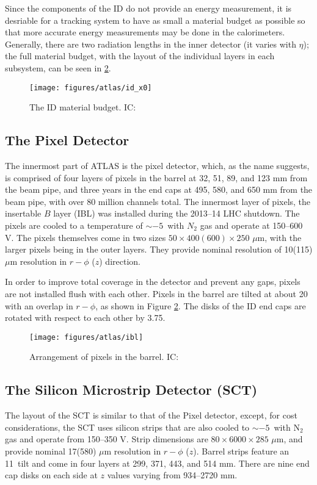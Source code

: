 Since the components of the ID do not provide an energy measurement, it is desriable for a tracking system to have as small a material budget as possible so that more accurate energy measurements may be done in the calorimeters.  Generally, there are two radiation lengths in the inner detector (it varies with $\eta$); the full material budget, with the layout of the individual layers in each subsystem, can be seen in \ref{fig:idmb}.  

\begin{figure}[!htbp]\captionsetup{justification=centering}
  \centering
  \texttt{[image: figures/atlas/id\_x0]}
  \caption{The ID material budget. IC: \cite{idmaterial}}
  \label{fig:idmb}
\end{figure}

\subsection{The Pixel Detector}
The innermost part of ATLAS is the pixel detector, which, as the name suggests, is comprised of four layers of pixels in the barrel at 32, 51, 89, and 123 mm from the beam pipe, and three years in the end caps at 495, 580, and 650 mm from the beam pipe, with over 80 million channels total.  The innermost layer of pixels, the insertable $B$ layer (IBL) was installed during the 2013--14 LHC shutdown.  The pixels are cooled to a temperature of $\sim-5$\celsius\, with $N_2$ gas and operate at 150--600 V.  The pixels themselves come in two sizes $50\times400(600)\times250$ $\mu$m, with the larger pixels being in the outer layers.  They provide nominal resolution of 10(115) $\mu$m resolution in $r-\phi$ ($z$) direction.

In order to improve total coverage in the detector and prevent any gaps, pixels are not installed flush with each other.  Pixels in the barrel are tilted at about 20\degree\, with an overlap in $r-\phi$, as shown in Figure \ref{fig:idmb}.  The disks of the ID end caps are rotated with respect to each other by 3.75\degree.

\begin{figure}[!htbp]\captionsetup{justification=centering}
  \centering
  \texttt{[image: figures/atlas/ibl]}
  \caption{Arrangement of pixels in the barrel. IC: \cite{ibltdr}}
  \label{fig:idmb}
\end{figure}

\subsection{The Silicon Microstrip Detector (SCT)}
The layout of the SCT is similar to that of the Pixel detector, except, for cost considerations, the SCT uses silicon strips that are also cooled to $\sim-5$\celsius\  with N$_2$ gas and operate from 150--350 V.  Strip dimensions are $80\times 6 000\times285$ $\mu$m, and provide nominal  17(580) $\mu$m resolution in $r-\phi$ ($z$).  Barrel strips feature an 11\degree\ tilt and come in four layers at 299, 371, 443, and 514 mm.  There are nine  end cap disks on each side at $z$ values varying from 934--2720 mm.

